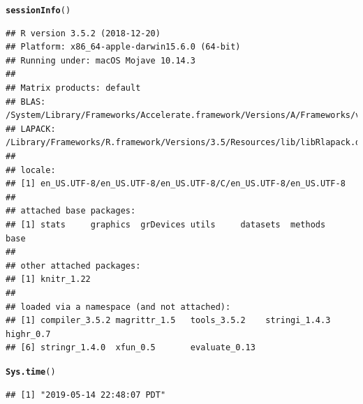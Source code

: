 \documentclass{article}\usepackage[]{graphicx}\usepackage[]{color}
\makeatletter
\newcommand{\hlstd}[1]{\textcolor[rgb]{0.345,0.345,0.345}{#1}}%
\newcommand{\hlkwd}[1]{\textcolor[rgb]{0.737,0.353,0.396}{\textbf{#1}}}%
\newenvironment{kframe}{%
 \def\at@end@of@kframe{}%
 \ifinner\ifhmode%
  \def\at@end@of@kframe{\end{minipage}}%
  \begin{minipage}{\columnwidth}%
 \fi\fi%
 \def\FrameCommand##1{\hskip\@totalleftmargin \hskip-\fboxsep
 \colorbox{shadecolor}{##1}\hskip-\fboxsep
     \hskip-\linewidth \hskip-\@totalleftmargin \hskip\columnwidth}%
 \MakeFramed {\advance\hsize-\width
   \@totalleftmargin\z@ \linewidth\hsize
   \@setminipage}}%
 {\par\unskip\endMakeFramed%
 \at@end@of@kframe}
\newenvironment{knitrout}{}{} %
\makeatother
\begin{document}
\begin{knitrout}
\color{fgcolor}\begin{kframe}
\begin{alltt}
\hlkwd{sessionInfo}\hlstd{()}
\end{alltt}
\begin{verbatim}
## R version 3.5.2 (2018-12-20)
## Platform: x86_64-apple-darwin15.6.0 (64-bit)
## Running under: macOS Mojave 10.14.3
## 
## Matrix products: default
## BLAS: /System/Library/Frameworks/Accelerate.framework/Versions/A/Frameworks/vecLib.framework/Versions/A/libBLAS.dylib
## LAPACK: /Library/Frameworks/R.framework/Versions/3.5/Resources/lib/libRlapack.dylib
## 
## locale:
## [1] en_US.UTF-8/en_US.UTF-8/en_US.UTF-8/C/en_US.UTF-8/en_US.UTF-8
## 
## attached base packages:
## [1] stats     graphics  grDevices utils     datasets  methods   base     
## 
## other attached packages:
## [1] knitr_1.22
## 
## loaded via a namespace (and not attached):
## [1] compiler_3.5.2 magrittr_1.5   tools_3.5.2    stringi_1.4.3  highr_0.7     
## [6] stringr_1.4.0  xfun_0.5       evaluate_0.13
\end{verbatim}
\begin{alltt}
\hlkwd{Sys.time}\hlstd{()}
\end{alltt}
\begin{verbatim}
## [1] "2019-05-14 22:48:07 PDT"
\end{verbatim}
\end{kframe}
\end{knitrout}
\end{document}
